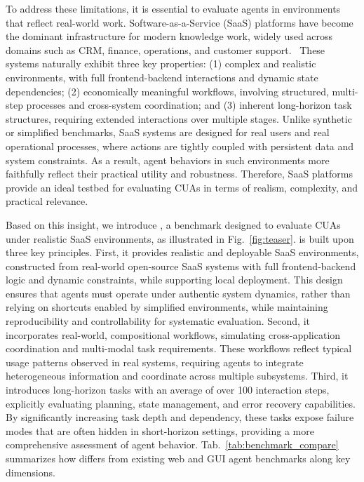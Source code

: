 To address these limitations, it is essential to evaluate agents in environments that reflect real-world work. Software-as-a-Service (SaaS) platforms have become the dominant infrastructure for modern knowledge work, widely used across domains such as CRM, finance, operations, and customer support.~\cite{ibm_saas,gartner_saas} These systems naturally exhibit three key properties: (1) complex and realistic environments, with full frontend-backend interactions and dynamic state dependencies; (2) economically meaningful workflows, involving structured, multi-step processes and cross-system coordination; and (3) inherent long-horizon task structures, requiring extended interactions over multiple stages. Unlike synthetic or simplified benchmarks, SaaS systems are designed for real users and real operational processes, where actions are tightly coupled with persistent data and system constraints. As a result, agent behaviors in such environments more faithfully reflect their practical utility and robustness. Therefore, SaaS platforms provide an ideal testbed for evaluating CUAs in terms of realism, complexity, and practical relevance.

Based on this insight, we introduce \datasetname, a benchmark designed to evaluate CUAs under realistic SaaS environments, as illustrated in Fig.~\ref{fig:teaser}. \datasetname is built upon three key principles. First, it provides realistic and deployable SaaS environments, constructed from real-world open-source SaaS systems with full frontend-backend logic and dynamic constraints, while supporting local deployment. This design ensures that agents must operate under authentic system dynamics, rather than relying on shortcuts enabled by simplified environments, while maintaining reproducibility and controllability for systematic evaluation. Second, it incorporates real-world, compositional workflows, simulating cross-application coordination and multi-modal task requirements. These workflows reflect typical usage patterns observed in real systems, requiring agents to integrate heterogeneous information and coordinate across multiple subsystems. Third, it introduces long-horizon tasks with an average of over 100 interaction steps, explicitly evaluating planning, state management, and error recovery capabilities. By significantly increasing task depth and dependency, these tasks expose failure modes that are often hidden in short-horizon settings, providing a more comprehensive assessment of agent behavior. Tab.~\ref{tab:benchmark_compare} summarizes how \datasetname differs from existing web and GUI agent benchmarks along key dimensions.

